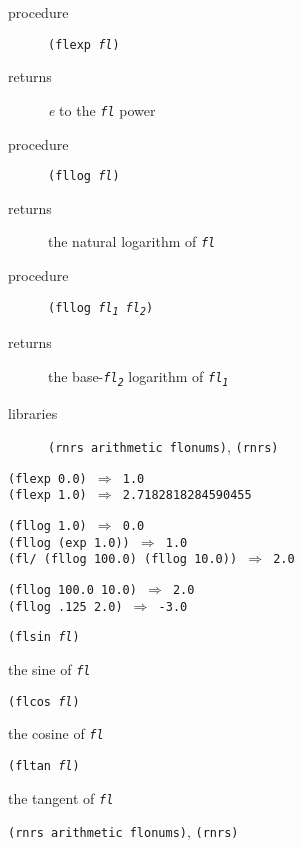 \begin{description}

\label{objects_s193}\item[procedure] \texttt{(flexp \textit{fl})}



\item[returns] \textit{e} to the \texttt{\textit{fl}} power


\item[procedure] \texttt{(fllog \textit{fl})}



\item[returns] the natural logarithm of \texttt{\textit{fl}}


\item[procedure] \texttt{(fllog \textit{fl\textsubscript{1}} \textit{fl\textsubscript{2}})}



\item[returns] the base-\texttt{\textit{fl\textsubscript{2}}} logarithm of \texttt{\textit{fl\textsubscript{1}}}


\item[libraries] \texttt{(rnrs arithmetic flonums)}, \texttt{(rnrs)}
\end{description}


\begin{alltt}
(flexp 0.0) \(\Rightarrow\) 1.0
(flexp 1.0) \(\Rightarrow\) 2.7182818284590455

(fllog 1.0) \(\Rightarrow\) 0.0
(fllog (exp 1.0)) \(\Rightarrow\) 1.0
(fl/ (fllog 100.0) (fllog 10.0)) \(\Rightarrow\) 2.0

(fllog 100.0 10.0) \(\Rightarrow\) 2.0
(fllog .125 2.0) \(\Rightarrow\) -3.0
\end{alltt}

\begin{description}

\label{objects_s194}\item[procedure] \texttt{(flsin \textit{fl})}



\item[returns] the sine of \texttt{\textit{fl}}


\item[procedure] \texttt{(flcos \textit{fl})}



\item[returns] the cosine of \texttt{\textit{fl}}


\item[procedure] \texttt{(fltan \textit{fl})}



\item[returns] the tangent of \texttt{\textit{fl}}


\item[libraries] \texttt{(rnrs arithmetic flonums)}, \texttt{(rnrs)}
\end{description}


